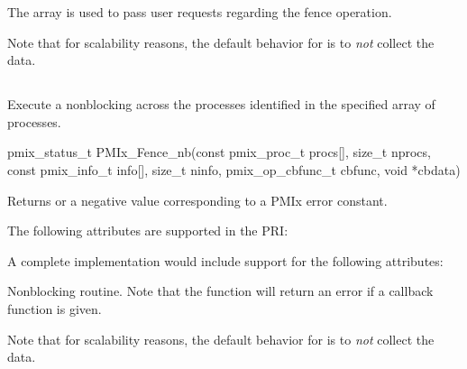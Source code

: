The  array is used to pass user requests regarding the fence operation.

Note that for scalability reasons, the default behavior for  is to \emph{not} collect the data.


\subsection{}

\summary

Execute a nonblocking  across the processes identified in the specified array of processes.

\format

\cspecificstart
\begin{codepar}
pmix_status_t
PMIx_Fence_nb(const pmix_proc_t procs[], size_t nprocs,
              const pmix_info_t info[], size_t ninfo,
              pmix_op_cbfunc_t cbfunc, void *cbdata)
\end{codepar}
\cspecificend

\begin{arglist}
\end{arglist}

Returns  or a negative value corresponding to a PMIx error constant.

\priattr
The following attributes are supported in the \ac{PRI}:


\optattr
A complete implementation would include support for the following attributes:


\descr

Nonblocking  routine.
Note that the function will return an error if a  callback function is given.

Note that for scalability reasons, the default behavior for  is to \emph{not} collect the data.


